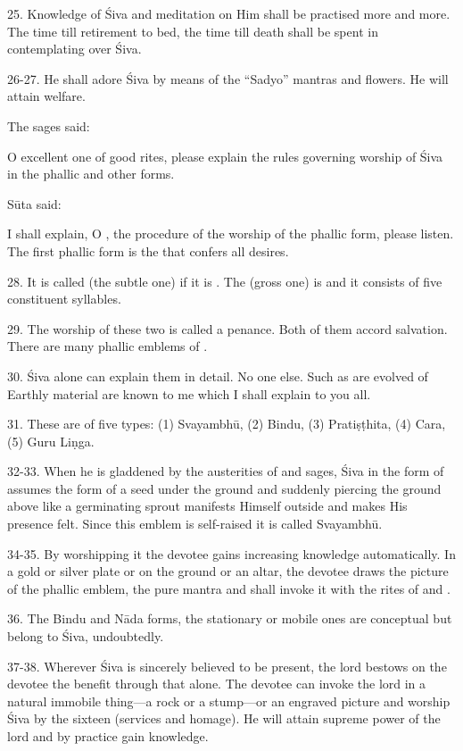25. Knowledge of Śiva and meditation on Him shall be practised more and more.
The time till retirement to bed, the time till death shall be spent in
contemplating over Śiva.

26-27. He shall adore Śiva by means of the “Sadyo” mantras and flowers. He will
attain welfare.

The sages said:

O excellent one of good rites, please explain the rules governing worship of
Śiva in the phallic and other forms.

Sūta said:

I shall explain, O , the procedure of the worship of the phallic
form, please listen. The first phallic form is the  that confers
all desires.

28. It is called  (the subtle one) if it is .
The  (gross one) is  and it consists of five constituent
syllables.

29. The worship of these two is called a penance. Both of them accord salvation.
There are many phallic emblems of .

30. Śiva alone can explain them in detail. No one else. Such as are evolved of
Earthly material are known to me which I shall explain to you all.

31. These are of five types: (1) Svayambhū, (2) Bindu, (3) Pratiṣṭhita, (4) Cara,
(5) Guru Liṇga.

32-33. When he is gladdened by the austerities of  and sages, Śiva in
the form of  assumes the form of a seed under the ground and suddenly
piercing the ground above like a germinating sprout manifests Himself outside
and makes His presence felt. Since this emblem is self-raised it is called
Svayambhū.

34-35. By worshipping it the devotee gains increasing knowledge automatically.
In a gold or silver plate or on the ground or an altar, the devotee draws
the picture of the phallic emblem, the pure  mantra and shall invoke
it with the rites of  and .

36. The Bindu and Nāda forms, the stationary or mobile ones are conceptual but
belong to Śiva, undoubtedly.

37-38. Wherever Śiva is sincerely believed to be present, the lord bestows on
the devotee the benefit through that alone. The devotee can invoke the lord in
a natural immobile thing—a rock or a stump—or an engraved picture and worship
Śiva by the sixteen  (services and homage). He will attain supreme
power of the lord and by practice gain knowledge.

